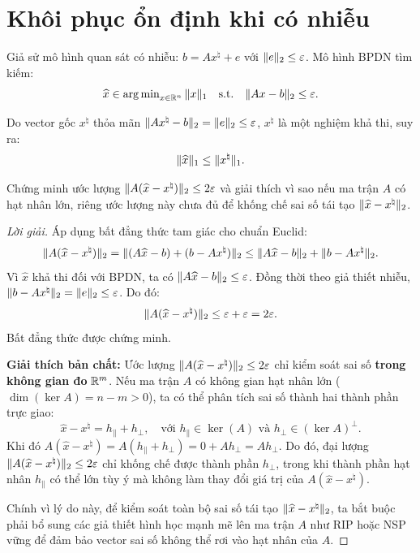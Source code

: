 \section{Khôi phục ổn định khi có nhiễu}
Giả sử mô hình quan sát có nhiễu: $b = Ax^\natural + e$ với $\|e\|_2 \le \varepsilon$. Mô hình BPDN tìm kiếm:
\begin{equation}
    \widehat{x} \in \operatorname{arg\,min}_{x \in \mathbb{R}^n} \|x\|_1 \quad \text{s.t.} \quad \|Ax - b\|_2 \le \varepsilon.
\end{equation}

Do vector gốc $x^\natural$ thỏa mãn $\|Ax^\natural - b\|_2 = \|e\|_2 \le \varepsilon$, $x^\natural$ là một nghiệm khả thi, suy ra:
\begin{equation}
    \|\widehat{x}\|_1 \le \|x^\natural\|_1.
\end{equation}

\begin{exercise}
Chứng minh ước lượng $\|A(\widehat{x} - x^\natural)\|_2 \le 2\varepsilon$ và giải thích vì sao nếu ma trận $A$ có hạt nhân lớn, riêng ước lượng này chưa đủ để khống chế sai số tái tạo $\|\widehat{x} - x^\natural\|_2$.
\end{exercise}

\begin{proof}[Lời giải]
Áp dụng bất đẳng thức tam giác cho chuẩn Euclid:
\[
\|A(\widehat{x} - x^\natural)\|_2 = \|(A\widehat{x} - b) + (b - Ax^\natural)\|_2 \le \|A\widehat{x} - b\|_2 + \|b - Ax^\natural\|_2.
\]
Vì $\widehat{x}$ khả thi đối với BPDN, ta có $\|A\widehat{x} - b\|_2 \le \varepsilon$. Đồng thời theo giả thiết nhiễu, $\|b - Ax^\natural\|_2 = \|e\|_2 \le \varepsilon$. Do đó:
\[
\|A(\widehat{x} - x^\natural)\|_2 \le \varepsilon + \varepsilon = 2\varepsilon.
\]
Bất đẳng thức được chứng minh.

\textbf{Giải thích bản chất:} 
Ước lượng $\|A(\widehat{x} - x^\natural)\|_2 \le 2\varepsilon$ chỉ kiểm soát sai số \textbf{trong không gian đo} $\mathbb{R}^m$. 
Nếu ma trận $A$ có không gian hạt nhân lớn ($\dim(\ker A) = n - m > 0$), ta có thể phân tích sai số thành hai thành phần trực giao:
\[
\widehat{x} - x^\natural = h_{\parallel} + h_{\perp}, \quad \text{với } h_{\parallel} \in \ker(A) \text{ và } h_{\perp} \in (\ker A)^\perp.
\]
Khi đó $A(\widehat{x} - x^\natural) = A(h_{\parallel} + h_{\perp}) = 0 + Ah_{\perp} = Ah_{\perp}$. 
Do đó, đại lượng $\|A(\widehat{x} - x^\natural)\|_2 \le 2\varepsilon$ chỉ khống chế được thành phần $h_{\perp}$, trong khi thành phần hạt nhân $h_{\parallel}$ có thể lớn tùy ý mà không làm thay đổi giá trị của $A(\widehat{x} - x^\natural)$. 

Chính vì lý do này, để kiểm soát toàn bộ sai số tái tạo $\|\widehat{x} - x^\natural\|_2$, ta bắt buộc phải bổ sung các giả thiết hình học mạnh mẽ lên ma trận $A$ như RIP hoặc NSP vững để đảm bảo vector sai số không thể rơi vào hạt nhân của $A$.
\end{proof}


